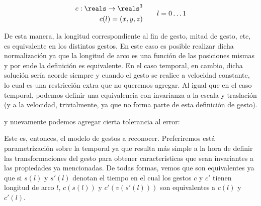 \begin{equation}
  \begin{split}
    c : \reals \rightarrow \reals^3 \\
    c(l)=(x,y,z)
  \end{split}
  \quad \quad
  \begin{split}
    l=0 \dots 1
  \end{split}
\end{equation} 

De esta manera, la longitud correspondiente al fin de gesto, mitad de gesto, etc, es equivalente en los distintos gestos. En este caso es posible realizar dicha normalización ya que la longitud de arco es una función de las posiciones mismas y por ende la definición es equivalente. En el caso temporal, en cambio, dicha solución sería acorde siempre y cuando el gesto se realice a velocidad constante, lo cual es una restricción extra que no queremos agregar.
 Al igual que en el caso temporal, podemos definir una equivalencia con invarianza a la escala y traslación (y a la velocidad, trivialmente, ya que no forma parte de esta definición de gesto). 


y nuevamente podemos agregar cierta tolerancia al error:


Este es, entonces, el modelo de gestos a reconocer. Preferiremos está parametrización sobre la temporal ya que resulta más simple a la hora de definir las transformaciones del gesto para obtener características que sean invariantes a las propiedades ya mencionadas. De todas formas, vemos que son equivalentes ya que si $s(l)$ y $s'(l)$ denotan el tiempo en el cual los gestos $c$ y $c'$ tienen longitud de arco $l$, $c(s(l))$ y $c'(v(s'(l)))$ son equivalentes a $c(l)$ y $c'(l)$.


